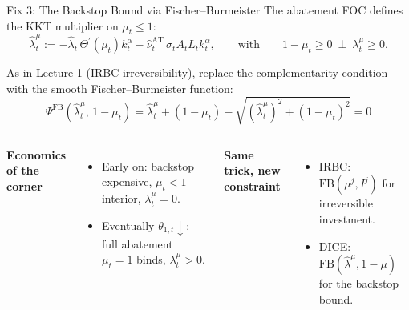 \documentclass[aspectratio=169,11pt]{beamer}
\newcommand{\emphc}[1]{\textcolor{harvardcrimson}{#1}}
\begin{document}
\begin{frame}{Fix 3: The Backstop Bound via Fischer--Burmeister}
\small
The abatement FOC defines the KKT multiplier on $\mu_t \leq 1$:
\[
\hat{\lambda}^{\mu}_{t} := -\hat{\lambda}_t\, \Theta^{\prime}\left(\mu_{t}\right) k_t^{\alpha}  - \hat{\nu}_t^{\text{AT}}\, \sigma_t A_{t}L_{t}k_{t}^{\alpha},
\qquad\text{with}\qquad
1 - \mu_{t} \geq 0 \ \perp\ \lambda^{\mu}_{t} \geq 0 .
\]

As in Lecture 1 (IRBC irreversibility), replace the complementarity condition with the smooth \emphc{Fischer--Burmeister} function:
\[
\boxed{\;\Psi^{\text{FB}}\left(\hat{\lambda}^{\mu}_{t},\, 1-\mu_{t}\right) =
  \hat{\lambda}^{\mu}_{t} + \left(1 - \mu_{t}\right) -
  \sqrt{\left(\hat{\lambda}^{\mu}_{t} \right)^2 + \left(1-\mu_{t}\right)^{2}} = 0\;}
\]

\vspace{0.2cm}
\begin{columns}[T]
\textbf{Economics of the corner}
\begin{itemize}
    \item Early on: backstop expensive, $\mu_t < 1$ interior, $\lambda^{\mu}_t = 0$.
    \item Eventually $\theta_{1,t} \downarrow$: full abatement $\mu_t = 1$ binds, $\lambda^{\mu}_t > 0$.
\end{itemize}

\textbf{Same trick, new constraint}
\begin{itemize}
    \item IRBC: $\mathrm{FB}(\mu^j, I^j)$ for irreversible investment.
    \item DICE: $\mathrm{FB}(\hat{\lambda}^{\mu}, 1-\mu)$ for the backstop bound.
\end{itemize}
\end{columns}
\end{frame}
\end{document}
